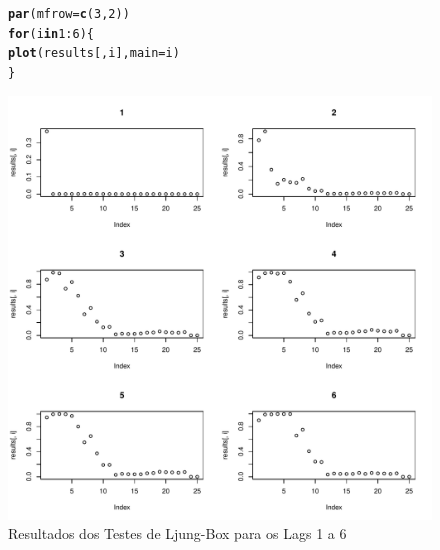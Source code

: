 \documentclass{article}\usepackage[]{graphicx}\usepackage[]{color}
\makeatletter
\def\maxwidth{ %
  \ifdim\Gin@nat@width>\linewidth
    \linewidth
  \else
    \Gin@nat@width
  \fi
}
\newcommand{\hlnum}[1]{\textcolor[rgb]{0.686,0.059,0.569}{#1}}%
\newcommand{\hlopt}[1]{\textcolor[rgb]{0,0,0}{#1}}%
\newcommand{\hlstd}[1]{\textcolor[rgb]{0.345,0.345,0.345}{#1}}%
\newcommand{\hlkwa}[1]{\textcolor[rgb]{0.161,0.373,0.58}{\textbf{#1}}}%
\newcommand{\hlkwc}[1]{\textcolor[rgb]{0.333,0.667,0.333}{#1}}%
\newcommand{\hlkwd}[1]{\textcolor[rgb]{0.737,0.353,0.396}{\textbf{#1}}}%
\newenvironment{kframe}{%
 \def\at@end@of@kframe{}%
 \ifinner\ifhmode%
  \def\at@end@of@kframe{\end{minipage}}%
  \begin{minipage}{\columnwidth}%
 \fi\fi%
 \def\FrameCommand##1{\hskip\@totalleftmargin \hskip-\fboxsep
 \colorbox{shadecolor}{##1}\hskip-\fboxsep
     \hskip-\linewidth \hskip-\@totalleftmargin \hskip\columnwidth}%
 \MakeFramed {\advance\hsize-\width
   \@totalleftmargin\z@ \linewidth\hsize
   \@setminipage}}%
 {\par\unskip\endMakeFramed%
 \at@end@of@kframe}
\newenvironment{knitrout}{}{} %
\makeatother
\begin{document}
            \begin{figure}[H]
            \caption{Resultados dos Testes de Ljung-Box para os Lags 1 a 6}
            \centering
\begin{knitrout}
\color{fgcolor}\begin{kframe}
\begin{alltt}
\hlkwd{par}\hlstd{(}\hlkwc{mfrow} \hlstd{=} \hlkwd{c}\hlstd{(}\hlnum{3}\hlstd{,}\hlnum{2}\hlstd{))}
\hlkwa{for} \hlstd{(i} \hlkwa{in} \hlnum{1}\hlopt{:}\hlnum{6}\hlstd{)\{}
  \hlkwd{plot}\hlstd{(results[,i],} \hlkwc{main}\hlstd{=i)}
\hlstd{\}}
\end{alltt}
\end{kframe}
\includegraphics[width=\maxwidth]{figure/unnamed-chunk-32-1} 

\end{knitrout}
            \end{figure}
            
\end{document}
